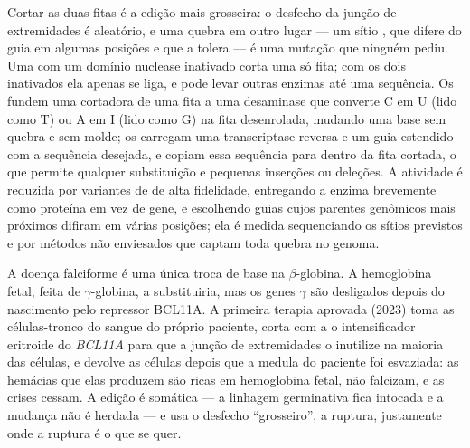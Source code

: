 \begin{proposition}\label{prop:b3:genetic-engineering:editors}
Cortar as duas fitas é a edição mais grosseira: o desfecho da junção de
extremidades é aleatório, e uma quebra em outro lugar --- um sítio
\emph{}, que difere do guia em algumas posições e que a
 tolera --- é uma mutação que ninguém pediu. Uma  com um
domínio nuclease inativado corta uma só fita; com os dois inativados
ela apenas se liga, e pode levar outras enzimas até uma sequência. Os
\emph{} fundem uma  cortadora de uma fita a uma
desaminase que converte C em U (lido como T) ou A em I (lido como G) na
fita desenrolada, mudando uma base sem quebra e sem molde; os
\emph{} carregam uma transcriptase reversa e um guia
estendido com a sequência desejada, e copiam essa sequência para dentro
da fita cortada, o que permite qualquer substituição e pequenas
inserções ou deleções. A atividade  é reduzida por
variantes de  de alta fidelidade, entregando a enzima brevemente
como proteína em vez de gene, e escolhendo guias cujos parentes
genômicos mais próximos difiram em várias posições; ela é medida
sequenciando os sítios previstos e por métodos não enviesados que
captam toda quebra no genoma.
\end{proposition}

\begin{example}\label{ex:b3:genetic-engineering:sickle}
A doença falciforme é uma única troca de base na $\beta$-globina. A
hemoglobina fetal, feita de $\gamma$-globina, a substituiria, mas os
genes $\gamma$ são desligados depois do nascimento pelo repressor
BCL11A. A primeira terapia  aprovada (2023) toma as
células-tronco do sangue do próprio paciente, corta com a  o
intensificador eritroide do \emph{BCL11A} para que a junção de
extremidades o inutilize na maioria das células, e devolve as células
depois que a medula do paciente foi esvaziada: as hemácias que elas
produzem são ricas em hemoglobina fetal, não falcizam, e as crises
cessam. A edição é somática --- a linhagem germinativa fica intocada e a
mudança não é herdada --- e usa o desfecho ``grosseiro'', a ruptura,
justamente onde a ruptura é o que se quer.
\end{example}

